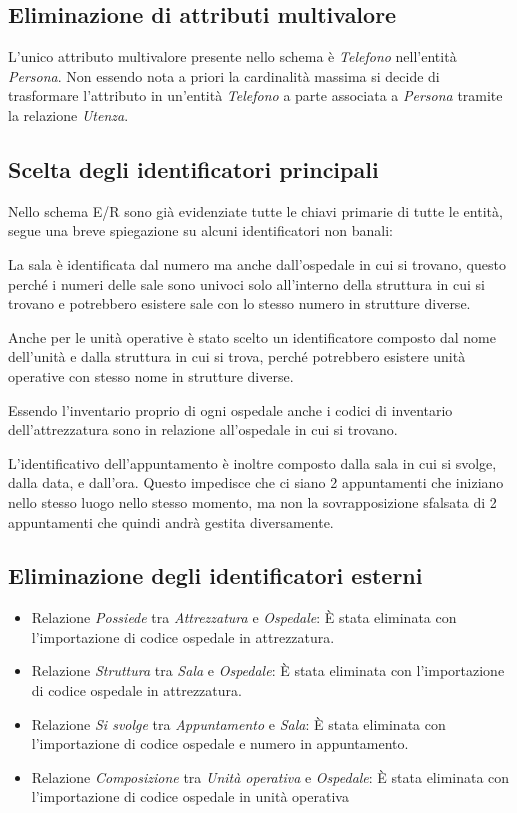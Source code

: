 \documentclass[a4paper,12pt]{report}
\begin{document}
\subsection{Eliminazione di attributi multivalore}
L'unico attributo multivalore presente nello schema è \emph{Telefono} nell'entità \emph{Persona}. Non essendo nota a priori la cardinalità massima
si decide di trasformare l'attributo in un'entità \emph{Telefono} a parte associata a \emph{Persona} tramite la relazione \emph{Utenza}.

\subsection{Scelta degli identificatori principali}
Nello schema E/R sono già evidenziate tutte le chiavi primarie di tutte le entità, segue una breve spiegazione su alcuni identificatori non banali:

La sala è identificata dal numero ma anche dall'ospedale in cui si trovano, questo perché i numeri delle sale sono univoci solo all'interno della
struttura in cui si trovano e potrebbero esistere sale con lo stesso numero in strutture diverse.

Anche per le unità operative è stato scelto un identificatore composto dal nome dell'unità e dalla struttura in cui si trova, perché potrebbero esistere
unità operative con stesso nome in strutture diverse.

Essendo l'inventario proprio di ogni ospedale anche i codici di inventario dell'attrezzatura sono in relazione all'ospedale in cui si trovano.

L'identificativo dell'appuntamento è inoltre composto dalla sala in cui si svolge, dalla data, e dall'ora. Questo impedisce che ci siano 2 appuntamenti che
iniziano nello stesso luogo nello stesso momento, ma non la sovrapposizione sfalsata di 2 appuntamenti che quindi andrà gestita diversamente.

\subsection{Eliminazione degli identificatori esterni}
\begin{itemize}
  \item Relazione \emph{Possiede} tra \emph{Attrezzatura} e \emph{Ospedale}: È stata eliminata con l'importazione di codice ospedale in attrezzatura.
  \item Relazione \emph{Struttura} tra \emph{Sala} e \emph{Ospedale}: È stata eliminata con l'importazione di codice ospedale in attrezzatura.
  \item Relazione \emph{Si svolge} tra \emph{Appuntamento} e \emph{Sala}: È stata eliminata con l'importazione di codice ospedale e numero in appuntamento.
  \item Relazione \emph{Composizione} tra \emph{Unità operativa} e \emph{Ospedale}: È stata eliminata con l'importazione di codice ospedale in unità operativa
\end{itemize}
\end{document}
